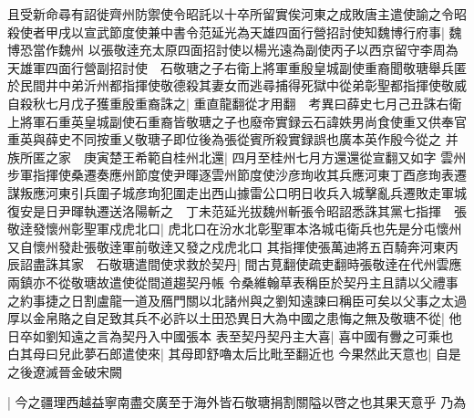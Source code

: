 且受新命尋有詔徙齊州防禦使令昭託以十卒所留實俟河東之成敗唐主遣使諭之令昭殺使者甲戌以宣武節度使兼中書令范延光為天雄四面行營招討使知魏博行府事|{
	魏博恐當作魏州}
以張敬逹充太原四面招討使以楊光遠為副使丙子以西京留守李周為天雄軍四面行營副招討使　石敬瑭之子右衛上將軍重殷皇城副使重裔聞敬瑭舉兵匿於民間井中弟沂州都指揮使敬德殺其妻女而逃尋捕得死獄中從弟彰聖都指揮使敬威自殺秋七月戊子獲重殷重裔誅之|{
	重直龍翻從才用翻　考異曰薛史七月己丑誅右衛上將軍石重英皇城副使石重裔皆敬瑭之子也廢帝實録云石諱妷男尚食使重又供奉官重英與薛史不同按重乂敬瑭子即位後為張從賓所殺實録誤也廣本英作殷今從之}
并族所匿之家　庚寅楚王希範自桂州北還|{
	四月至桂州七月方還還從宣翻又如字}
雲州步軍指揮使桑遷奏應州節度使尹暉逐雲州節度使沙彦珣收其兵應河東丁酉彦珣表遷謀叛應河東引兵圍子城彦珣犯圍走出西山據雷公口明日收兵入城擊亂兵遷敗走軍城復安是日尹暉執遷送洛陽斬之　丁未范延光拔魏州斬張令昭詔悉誅其黨七指揮　張敬逹發懷州彰聖軍戍虎北口|{
	虎北口在汾水北彰聖軍本洛城屯衛兵也先是分屯懷州又自懷州發赴張敬逹軍前敬逹又發之戍虎北口}
其指揮使張萬迪將五百騎奔河東丙辰詔盡誅其家　石敬瑭遣間使求救於契丹|{
	間古莧翻使疏吏翻時張敬逹在代州雲應兩鎮亦不從敬瑭故遣使從間道趨契丹帳}
令桑維翰草表稱臣於契丹主且請以父禮事之約事捷之日割盧龍一道及鴈門關以北諸州與之劉知遠諫曰稱臣可矣以父事之太過厚以金帛賂之自足致其兵不必許以土田恐異日大為中國之患悔之無及敬瑭不從|{
	他日卒如劉知遠之言為契丹入中國張本}
表至契丹契丹主大喜|{
	喜中國有釁之可乘也}
白其母曰兒此夢石郎遣使來|{
	其母即舒嚕太后比毗至翻近也}
今果然此天意也|{
	自是之後遼滅晉金破宋闕}


|{
	今之疆理西越益寧南盡交廣至于海外皆石敬瑭捐割關隘以啓之也其果天意乎}
乃為

